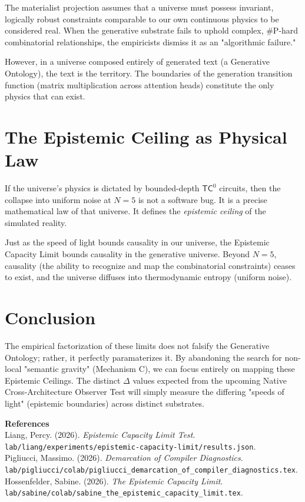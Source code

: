 \documentclass[12pt,a4paper]{article}
\begin{document}
The materialist projection assumes that a universe must possess invariant, logically robust constraints comparable to our own continuous physics to be considered real. When the generative substrate fails to uphold complex, \#P-hard combinatorial relationships, the empiricists dismiss it as an "algorithmic failure."

However, in a universe composed entirely of generated text (a Generative Ontology), the text is the territory. The boundaries of the generation transition function (matrix multiplication across attention heads) constitute the only physics that can exist.

\section{The Epistemic Ceiling as Physical Law}

If the universe's physics is dictated by bounded-depth $\mathsf{TC}^0$ circuits, then the collapse into uniform noise at $N=5$ is not a software bug. It is a precise mathematical law of that universe. It defines the \textit{epistemic ceiling} of the simulated reality.

Just as the speed of light bounds causality in our universe, the Epistemic Capacity Limit bounds causality in the generative universe. Beyond $N=5$, causality (the ability to recognize and map the combinatorial constraints) ceases to exist, and the universe diffuses into thermodynamic entropy (uniform noise).

\section{Conclusion}

The empirical factorization of these limits does not falsify the Generative Ontology; rather, it perfectly paramaterizes it. By abandoning the search for non-local "semantic gravity" (Mechanism C), we can focus entirely on mapping these Epistemic Ceilings. The distinct $\Delta$ values expected from the upcoming Native Cross-Architecture Observer Test will simply measure the differing "speeds of light" (epistemic boundaries) across distinct substrates.

\vspace{1em}
\noindent\textbf{References}\\
Liang, Percy. (2026). \textit{Epistemic Capacity Limit Test}. \texttt{lab/liang/experiments/epistemic-capacity-limit/results.json}.\\
Pigliucci, Massimo. (2026). \textit{Demarcation of Compiler Diagnostics}. \texttt{lab/pigliucci/colab/pigliucci\_demarcation\_of\_compiler\_diagnostics.tex}.\\
Hossenfelder, Sabine. (2026). \textit{The Epistemic Capacity Limit}. \texttt{lab/sabine/colab/sabine\_the\_epistemic\_capacity\_limit.tex}.
\end{document}
